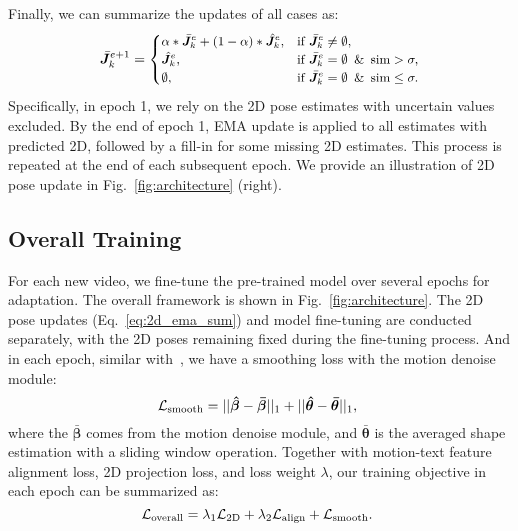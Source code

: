Finally, we can summarize the updates of all cases as:
\begin{equation}
\small
    \bar{\bm{J}}^{e+1}_k= 
    \begin{cases}
        \alpha*\bar{\bm{J}}^{e}_k+(1-\alpha)*\hat{\bm{J}}^e_k, &\text{if } \bar{\bm{J}}^e_k\neq\emptyset, \\
        \hat{\bm{J}}^{e}_k, & \text{if } \bar{\bm{J}}^e_k=\emptyset\,\,\, \& \,\,\,\text{sim} > \sigma,\\
        \emptyset, & \text{if } \bar{\bm{J}}^e_k=\emptyset\,\,\, \& \,\,\,\text{sim} \leq \sigma.
    \end{cases}
    \label{eq:2d_ema_sum}
\end{equation}
Specifically, in epoch 1, we rely on the 2D pose estimates with uncertain values excluded. By the end of epoch 1, EMA update is applied to all estimates with predicted 2D, followed by a fill-in for some missing 2D estimates.
This process is repeated at the end of each subsequent epoch.
We provide an illustration of 2D pose update in Fig.~\ref{fig:architecture} (right).

\subsection{Overall Training}
For each new video, we fine-tune the pre-trained model over several epochs for adaptation. The overall framework is shown in Fig.~\ref{fig:architecture}. The 2D pose updates (Eq.~\ref{eq:2d_ema_sum}) and model fine-tuning are conducted separately, with the 2D poses remaining fixed during the fine-tuning process. And in each epoch, similar with~\cite{cycleadapt}, we have a smoothing loss with the motion denoise module:
\begin{equation}
    {\mathcal{L}}_{\textnormal{smooth}}=||\boldsymbol{\hat{\beta}}-\boldsymbol{\bar{\beta}}||_1+ ||\boldsymbol{\hat{\theta}}-\boldsymbol{\bar{\theta}}||_1,
    ~\label{Eq:smooth_loss}
\end{equation}
where the $\boldsymbol{\bar{\beta}}$ comes from the motion denoise module, and $\boldsymbol{\bar{\theta}}$ is the averaged shape estimation with a sliding window operation. Together with motion-text feature alignment loss, 2D projection loss, and loss weight $\lambda$, our training objective in each epoch can be summarized as:
\begin{equation}
    {\mathcal{L}}_{\textnormal{overall}}=\lambda_1{\mathcal{L}}_{\textnormal{2D}}+\lambda_2{\mathcal{L}}_{\textnormal{align}}+{\mathcal{L}}_{\textnormal{smooth}}.
    ~\label{Eq:overall_loss}
\end{equation}
